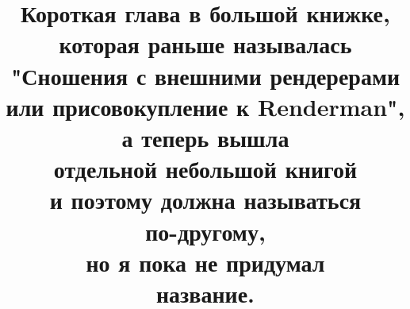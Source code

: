 \documentclass[11pt,a4paper]{book}
\title{Короткая глава в большой книжке,\\ которая раньше называлась\\ "Сношения с внешними рендерерами\\ или присовокупление к Renderman",\\ а теперь вышла\\ отдельной небольшой книгой\\ и поэтому должна называться\\ по-другому,\\ но я пока не придумал\\ название.}
\author{}
\date{}                                           %
\begin{document}
\Rus
{}

\newcommand{\gr}[1]{\begin{center}\texttt{[image: chapterRendermanOK\_files/\#1.png]}\end{center}}


\newcommand{\code}[1]{}




















\end{document}
